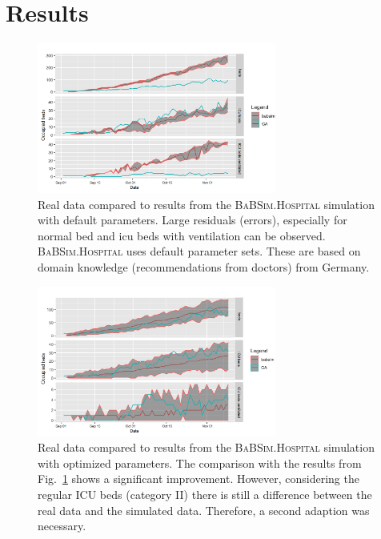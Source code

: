 \documentclass[conference]{IEEEtran}
\newcommand{\babsimhospital}{\textsc{BaBSim.Hospital}\xspace}
\begin{document}
\section{Results}\label{sec:results}
\begin{figure}
  \centering
   \includegraphics[width=0.7\textwidth]{default.png}
  \caption{Real data compared to results from the \babsimhospital simulation with default parameters. Large residuals (errors), especially for normal bed and icu beds with ventilation can be observed.
   \babsimhospital uses default parameter sets. These are based on domain knowledge (recommendations from doctors) from Germany. }
\label{fig:default}
\end{figure}
\begin{figure}
    \centering
    \includegraphics[width=0.7\textwidth]{optimized01.png}
    \caption{Real data compared to results from the \babsimhospital simulation with optimized parameters. The comparison with the results from Fig.~\ref{fig:default} shows a significant improvement. However, considering the regular \gls{ICU} beds (category II) there is still a difference between the real data and the simulated data. Therefore, a second adaption was necessary.
  }
\label{fig:optimized01}
\end{figure}
\end{document}
